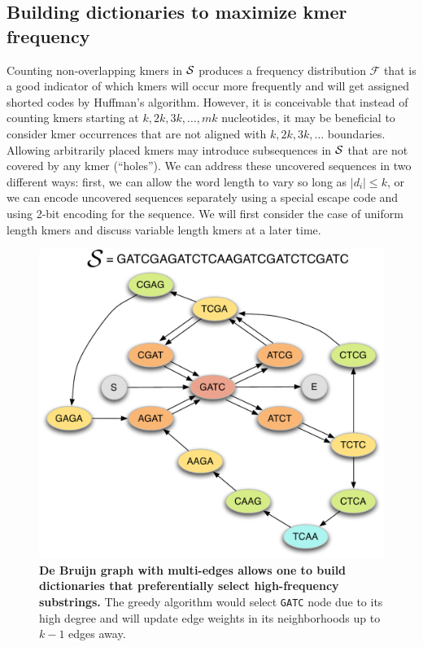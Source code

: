 \documentclass[12pt]{cmuthesis}
\begin{document}
  \subsection{Building dictionaries to maximize kmer frequency}

  Counting non-overlapping kmers in $\mathcal{S}$ produces a frequency distribution $\mathcal{F}$ that is a good indicator of which kmers will occur more frequently and will get assigned shorted codes by Huffman's algorithm. However, it is conceivable that instead of counting kmers starting at $k, 2k, 3k, \ldots, mk$ nucleotides, it may be beneficial to consider kmer occurrences that are not aligned with $k, 2k, 3k, \ldots$ boundaries. Allowing arbitrarily placed kmers may introduce subsequences in $\mathcal{S}$ that are not covered by any kmer (``holes''). We can address these uncovered sequences in two different ways: first, we can allow the word length to vary so long as $|d_i| \leq k$, or we can encode uncovered sequences separately using a special escape code and using 2-bit encoding for the sequence. We will first consider the case of uniform length kmers and discuss variable length kmers at a later time.

  \begin{figure}[ht]
    \centering
    \includegraphics[width=0.7\linewidth]{figures/huffmer_node_neighborhoods}
    \caption{\textbf{De Bruijn graph with multi-edges allows one to build dictionaries that preferentially select high-frequency substrings.} The greedy algorithm would select \texttt{GATC} node due to its high degree and will update edge weights in its neighborhoods up to $k-1$ edges away.}
    \label{fig:denovo:debruijn}
  \end{figure}
\end{document}
